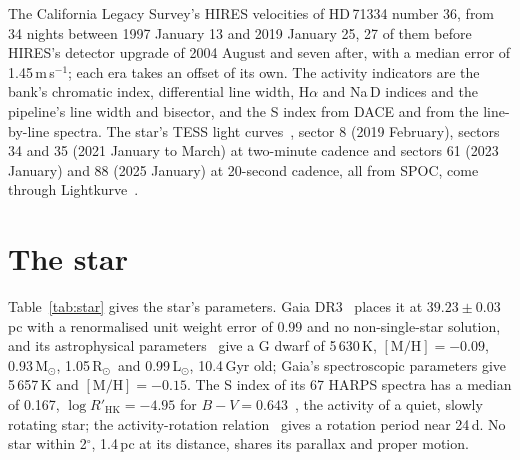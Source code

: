 \documentclass[3p,11pt]{elsarticle}
\newcommand{\ms}{m\,s$^{-1}$}
\newcommand{\Msun}{M$_\odot$}
\newcommand{\Rsun}{R$_\odot$}
\newcommand{\Lsun}{L$_\odot$}
\begin{document}
The California Legacy Survey's HIRES velocities of HD\,71334 number 36, from 34 nights between 1997
January 13 and 2019 January 25, 27 of them before HIRES's detector upgrade of 2004 August and seven
after, with a median error of 1.45\,\ms; each era takes an offset of its own. The activity indicators are
the bank's chromatic index, differential line width, H$\alpha$ and Na\,D indices and the pipeline's
line width and bisector, and the S index from DACE and from the line-by-line spectra. The star's TESS
light curves~\cite{Ricker2015}, sector 8 (2019 February), sectors 34 and 35 (2021 January to March) at
two-minute cadence and sectors 61 (2023 January) and 88 (2025 January) at 20-second cadence, all from
SPOC, come through Lightkurve~\cite{Lightkurve2018}.

\section{The star}\label{sec:star}

Table~\ref{tab:star} gives the star's parameters. Gaia DR3~\cite{GaiaDR3} places it at
$39.23 \pm 0.03$\,pc with a renormalised unit weight error of 0.99 and no non-single-star solution, and
its astrophysical parameters~\cite{Creevey2023} give a G dwarf of 5\,630\,K, $[\mathrm{M/H}] = -0.09$,
0.93\,\Msun, 1.05\,\Rsun\ and 0.99\,\Lsun, 10.4\,Gyr old; Gaia's spectroscopic parameters give
5\,657\,K and $[\mathrm{M/H}] = -0.15$. The S index of its 67 HARPS spectra has a median of 0.167,
$\log R'_\mathrm{HK} = -4.95$ for $B-V = 0.643$~\cite{Noyes1984}, the activity of a quiet, slowly
rotating star; the activity-rotation relation~\cite{Mamajek2008} gives a rotation period near 24\,d. No
star within 2$^\circ$, 1.4\,pc at its distance, shares its parallax and proper motion.
\end{document}
